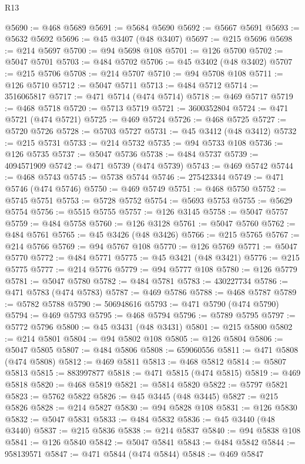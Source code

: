 \begin{lexlean}{R13}
\begin{coremodule}
@5690 := @468 @5689
@5691 := @5684 @5690
@5692 := @5667 @5691
@5693 := @5632 @5692
@5696 := @45 @3407 (@48 @3407)
@5697 := @215 @5696
@5698 := @214 @5697
@5700 := @94 @5698 @108
@5701 := @126 @5700
@5702 := @5047 @5701
@5703 := @484 @5702
@5706 := @45 @3402 (@48 @3402)
@5707 := @215 @5706
@5708 := @214 @5707
@5710 := @94 @5708 @108
@5711 := @126 @5710
@5712 := @5047 @5711
@5713 := @484 @5712
@5714 := 3516065817
@5717 := @471 @5714 (@474 @5714)
@5718 := @469 @5717
@5719 := @468 @5718
@5720 := @5713 @5719
@5721 := 3600352804
@5724 := @471 @5721 (@474 @5721)
@5725 := @469 @5724
@5726 := @468 @5725
@5727 := @5720 @5726
@5728 := @5703 @5727
@5731 := @45 @3412 (@48 @3412)
@5732 := @215 @5731
@5733 := @214 @5732
@5735 := @94 @5733 @108
@5736 := @126 @5735
@5737 := @5047 @5736
@5738 := @484 @5737
@5739 := 4094571909
@5742 := @471 @5739 (@474 @5739)
@5743 := @469 @5742
@5744 := @468 @5743
@5745 := @5738 @5744
@5746 := 275423344
@5749 := @471 @5746 (@474 @5746)
@5750 := @469 @5749
@5751 := @468 @5750
@5752 := @5745 @5751
@5753 := @5728 @5752
@5754 := @5693 @5753
@5755 := @5629 @5754
@5756 := @5515 @5755
@5757 := @126 @3145
@5758 := @5047 @5757
@5759 := @484 @5758
@5760 := @126 @3128
@5761 := @5047 @5760
@5762 := @484 @5761
@5765 := @45 @3426 (@48 @3426)
@5766 := @215 @5765
@5767 := @214 @5766
@5769 := @94 @5767 @108
@5770 := @126 @5769
@5771 := @5047 @5770
@5772 := @484 @5771
@5775 := @45 @3421 (@48 @3421)
@5776 := @215 @5775
@5777 := @214 @5776
@5779 := @94 @5777 @108
@5780 := @126 @5779
@5781 := @5047 @5780
@5782 := @484 @5781
@5783 := 430227734
@5786 := @471 @5783 (@474 @5783)
@5787 := @469 @5786
@5788 := @468 @5787
@5789 := @5782 @5788
@5790 := 506948616
@5793 := @471 @5790 (@474 @5790)
@5794 := @469 @5793
@5795 := @468 @5794
@5796 := @5789 @5795
@5797 := @5772 @5796
@5800 := @45 @3431 (@48 @3431)
@5801 := @215 @5800
@5802 := @214 @5801
@5804 := @94 @5802 @108
@5805 := @126 @5804
@5806 := @5047 @5805
@5807 := @484 @5806
@5808 := 659060556
@5811 := @471 @5808 (@474 @5808)
@5812 := @469 @5811
@5813 := @468 @5812
@5814 := @5807 @5813
@5815 := 883997877
@5818 := @471 @5815 (@474 @5815)
@5819 := @469 @5818
@5820 := @468 @5819
@5821 := @5814 @5820
@5822 := @5797 @5821
@5823 := @5762 @5822
@5826 := @45 @3445 (@48 @3445)
@5827 := @215 @5826
@5828 := @214 @5827
@5830 := @94 @5828 @108
@5831 := @126 @5830
@5832 := @5047 @5831
@5833 := @484 @5832
@5836 := @45 @3440 (@48 @3440)
@5837 := @215 @5836
@5838 := @214 @5837
@5840 := @94 @5838 @108
@5841 := @126 @5840
@5842 := @5047 @5841
@5843 := @484 @5842
@5844 := 958139571
@5847 := @471 @5844 (@474 @5844)
@5848 := @469 @5847

\end{coremodule}
\end{lexlean}
